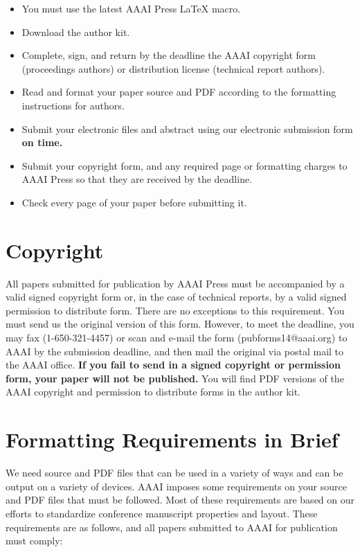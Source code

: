 \documentclass[letterpaper]{article}
\begin{document}
	\begin{itemize}
		\item You must use the latest AAAI Press \LaTeX{} macro.
		\item Download the author kit.
		\item Complete, sign, and return by the deadline the AAAI copyright form (proceedings authors) or distribution license (technical report authors).
		\item Read and format your paper source and PDF according to the formatting instructions for authors.
		\item Submit your electronic files and abstract using our electronic submission form \textbf{on time.}
		\item Submit your copyright form, and any required page or formatting charges to AAAI Press so that they are received by the deadline.
		\item Check every page of your paper before submitting it.
	\end{itemize}
	
	\section{Copyright}
	All papers submitted for publication by AAAI Press must be accompanied by a valid signed copyright form or, in the case of technical reports, by a valid signed permission to distribute form. There are no exceptions to this requirement. You must send us the original version of this form. However, to meet the deadline, you may fax (1-650-321-4457) or scan and e-mail the form (pubforms14@aaai.org) to AAAI by the submission deadline, and then mail the original via postal mail to the AAAI office. \textbf{If you fail to send in a signed copyright or permission form, your paper will not be published.} You will find PDF versions of the AAAI copyright and permission to distribute forms in the author kit.
	
	\section{Formatting Requirements in Brief}
	We need source and PDF files that can be used in a variety of ways and can be output on a variety of devices. AAAI imposes some requirements on your source and PDF files that must be followed. Most of these requirements are based on our efforts to standardize conference manuscript properties and layout. These requirements are as follows, and all papers submitted to AAAI for publication must comply:
	
\end{document}
